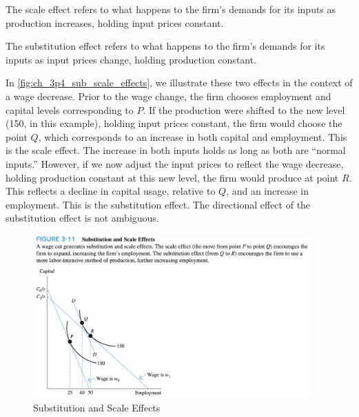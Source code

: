 \begin{definition} 
    
    The scale effect refers to what 
    happens to the firm's demands for its inputs
    as production increases, holding input prices constant.

\end{definition}

\begin{definition} 
    
    The substitution effect refers to what 
    happens to the firm's demands for its inputs
    as input prices change, holding production constant.
    
\end{definition}

In \autoref{fig:ch_3p4_sub_scale_effects},
we illustrate these two effects
in the context of a wage decrease.
Prior to the wage change, the firm chooses 
employment and capital levels corresponding to 
$P$. If the production were shifted to the new 
level (150, in this example), holding input prices constant,
the firm would choose the point $Q$, which
corresponds to an increase in both capital 
and employment. This is the scale effect. The increase 
in both inputs holds as long as both are ``normal inputs.''
However, if we now adjust the input prices
to reflect the wage decrease, holding production constant
at this new level, the firm would 
produce at point $R$. This 
reflects a decline in capital usage, relative to $Q$,
and an increase in employment. 
This is the substitution effect. The directional effect of the 
substitution effect is not ambiguous.


\FloatBarrier

\begin{figure}[!htb]
    \centering
        \includegraphics[width=0.95\textwidth]{../input/ch_3p4_sub_scale_effects.png}
    \caption{Substitution and Scale Effects}
    \label{fig:ch_3p4_sub_scale_effects}
\end{figure}

